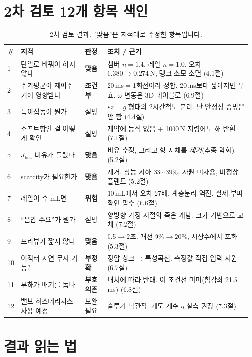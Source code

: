 \documentclass[11pt]{article}
\begin{document}
\section{2차 검토 12개 항목 색인}

\begin{table}[h]
\centering\footnotesize
\begin{tabular}{@{}p{0.35cm}p{3.5cm}p{1.5cm}p{7.4cm}@{}}
\toprule
\# & 지적 & 판정 & 조치 / 근거\\
\midrule
1 & 단열로 바꿔야 하지 않나 & \textbf{맞음} & 챔버 $n{=}1.4$, 레일 $n{=}1.0$. 오차 $0.380\to0.274$\,N, 탱크 소모 소멸 (4.1절)\\
2 & 주기평균이 제어주기에 영향받나 & \textbf{조건부} & 20\,ms$=$1회전이라 정합. 20\,ms보다 짧아지면 무효. $\omega$ 변동은 3D 테이블로 (6.9절)\\
3 & 특이섭동이 뭔가 & 설명 & $\varepsilon\dot z=g$ 형태의 2시간척도 분리. 단 안정성 증명은 안 함 (4.4절)\\
4 & 소프트항인 걸 어떻게 확인 & 설명 & 제약에 등식 없음 $+$ 1000\,N 지령에도 해 반환 (7.1절)\\
5 & $J_{\mathrm{fast}}$ 비유가 틀렸다 & \textbf{맞음} & 비유 수정, 그리고 항 자체를 \emph{제거}(추종 악화) (5.2절)\\
6 & scarcity가 필요한가 & \textbf{맞음} & 제거. 성능 저하 33$\sim$39\%, 자원 미사용, 비정상 플랜트 (5.2절)\\
7 & 레일이 수 mL면 & \textbf{위험} & 10\,mL에서 오차 27배, 계층분리 역전. 실제 부피 확인 필수 (6.6절)\\
8 & ``음압 수요''가 뭔가 & 설명 & 양방향 가정 시절의 죽은 개념. 크기 기반으로 교체 (7.2절)\\
9 & 프리뷰가 짧지 않나 & \textbf{맞음} & 0.5$\to$2초. 개선 $9\%\to20\%$, 시상수에서 포화 (5.3절)\\
10 & 이젝터 지연 무시 가능? & \textbf{부정확} & 정압 싱크$\to$특성곡선. 측정값 직접 입력 지원 (6.7절)\\
11 & 부하가 배기를 돕나 & \textbf{부호의존} & 배치에 따라 반대. 이 조건선 미미(힘감쇠 21.5\,ms) (6.8절)\\
12 & 밸브 히스테리시스 사용 예정 & 보완필요 & 슬루가 낙관적. 개도 계수 $\eta$ 실측 권장 (7.3절)\\
\bottomrule
\end{tabular}
\caption{2차 검토 결과. ``맞음''은 지적대로 수정한 항목입니다.}
\end{table}

\section{결과 읽는 법}
\end{document}
